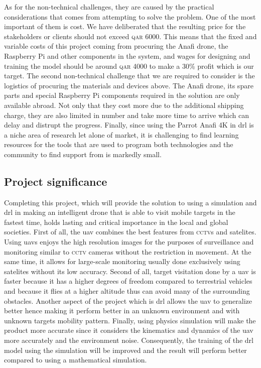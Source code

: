 \documentclass[../main.tex]{subfiles}
\begin{document}
As for the non-technical challenges, they are caused
by the practical considerations that comes 
from attempting to solve the problem.
One of the most important of them is cost. 
We have deliberated that
the resulting price for the stakeholders or clients
should not exceed \textsc{qar} 6000. 
This means that the fixed and variable costs of this project
coming from procuring the Anafi drone, the Raspberry Pi and other
components in the system, 
and wages for designing and training the model
should be around \textsc{qar} 4000 to make a 30\% profit 
which is our target.
The second non-technical challenge that we are required to consider
is the logistics of procuring the materials and devices above.
The Anafi drone, its spare parts and special Raspberry Pi
components required in the solution are only available abroad.
Not only that they cost more due to the additional shipping charge,
they are also limited in number 
and take more time to arrive which can delay 
and distrupt the progress.
Finally, since using the Parrot Anafi 4K in \gls{drl}
is a niche area of research let alone of market,
it is challenging to find learning resources for the tools
that are used to program both technologies
and the community to find support from is markedly small.


\blindtext

\subsection{Project significance}

Completing this project, which will provide the solution
to using a simulation and \gls{drl} in making an intelligent drone 
that is able to visit mobile targets in the fastest time,
holds lasting and critical importance 
in the local and global societies.
First of all, the \gls{uav} combines the best features
from \textsc{cctv}s and satelites.
Using \glspl{uav} enjoys the high resolution images
for the purposes of surveillance and monitoring
similar to \textsc{cctv} cameras without the restriction in movement.
At the same time, it allows for large-scale monitoring 
usually done exclusively using satelites without its low accuracy.
Second of all, target visitation done by a \gls{uav}
is faster because it has a higher degrees of freedom
compared to terrestrial vehicles and because
it flies at a higher altitude thus can avoid 
many of the surrounding obstacles.
Another aspect of the project which is \gls{drl} 
allows the \gls{uav} to generalize better
hence making it perform better in an unknown environment
and with unknown targets mobility pattern.
Finally, using physics simulation will make the product 
more accurate since it considers 
the kinematics and dynamics of the \gls{uav} more accurately
and the environment noise.
Consequently, the training of the \gls{drl} model 
using the simulation will be improved 
and the result will perform better
compared to using a mathematical simulation.
\end{document}
